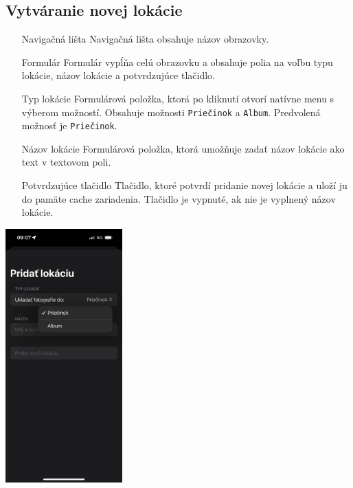 \documentclass[11pt]{article} %
\begin{document}
\pagebreak
\subsection{Vytváranie novej lokácie}
\begin{itemize}
\item[Navigačná lišta]{
	Navigačná lišta obsahuje názov obrazovky.
}
\item[Formulár]{
	Formulár vypĺňa celú obrazovku a obsahuje polia na voľbu typu lokácie, názov lokácie a potvrdzujúce tlačidlo.
}
\item[Typ lokácie]{
	Formulárová položka, ktorá po kliknutí otvorí natívne menu s výberom možností. Obsahuje možnosti {\tt Priečinok} a {\tt Album}. Predvolená možnosť je {\tt Priečinok}.
}
\item[Názov lokácie]{
	Formulárová položka, ktorá umožňuje zadať názov lokácie ako text v textovom poli.
}
\item[Potvrdzujúce tlačidlo]{
	Tlačidlo, ktoré potvrdí pridanie novej lokácie a uloží ju do pamäte cache zariadenia. Tlačidlo je vypnuté, ak nie je vyplnený názov lokácie.
}
\end{itemize}
\begin{center}
\includegraphics[width=4.5cm]{pridat.jpeg}
\end{center}

\pagebreak
\end{document}

